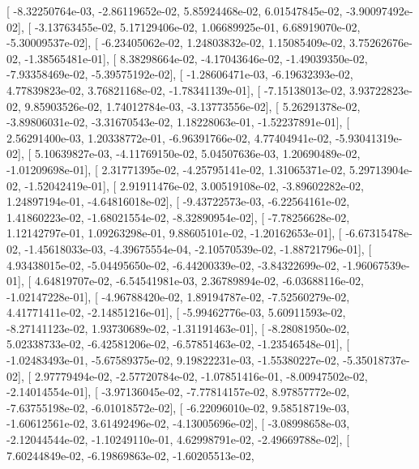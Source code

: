 \documentclass{article}
\begin{document}
       [ -8.32250764e-03,  -2.86119652e-02,   5.85924468e-02,
          6.01547845e-02,  -3.90097492e-02],
       [ -3.13763455e-02,   5.17129406e-02,   1.06689925e-01,
          6.68919070e-02,  -5.30009537e-02],
       [ -6.23405062e-02,   1.24803832e-02,   1.15085409e-02,
          3.75262676e-02,  -1.38565481e-01],
       [  8.38298664e-02,  -4.17043646e-02,  -1.49039350e-02,
         -7.93358469e-02,  -5.39575192e-02],
       [ -1.28606471e-03,  -6.19632393e-02,   4.77839823e-02,
          3.76821168e-02,  -1.78341139e-01],
       [ -7.15138013e-02,   3.93722823e-02,   9.85903526e-02,
          1.74012784e-03,  -3.13773556e-02],
       [  5.26291378e-02,  -3.89806031e-02,  -3.31670543e-02,
          1.18228063e-01,  -1.52237891e-01],
       [  2.56291400e-03,   1.20338772e-01,  -6.96391766e-02,
          4.77404941e-02,  -5.93041319e-02],
       [  5.10639827e-03,  -4.11769150e-02,   5.04507636e-03,
          1.20690489e-02,  -1.01209698e-01],
       [  2.31771395e-02,  -4.25795141e-02,   1.31065371e-02,
          5.29713904e-02,  -1.52042419e-01],
       [  2.91911476e-02,   3.00519108e-02,  -3.89602282e-02,
          1.24897194e-01,  -4.64816018e-02],
       [ -9.43722573e-03,  -6.22564161e-02,   1.41860223e-02,
         -1.68021554e-02,  -8.32890954e-02],
       [ -7.78256628e-02,   1.12142797e-01,   1.09263298e-01,
          9.88605101e-02,  -1.20162653e-01],
       [ -6.67315478e-02,  -1.45618033e-03,  -4.39675554e-04,
         -2.10570539e-02,  -1.88721796e-01],
       [  4.93438015e-02,  -5.04495650e-02,  -6.44200339e-02,
         -3.84322699e-02,  -1.96067539e-01],
       [  4.64819707e-02,  -6.54541981e-03,   2.36789894e-02,
         -6.03688116e-02,  -1.02147228e-01],
       [ -4.96788420e-02,   1.89194787e-02,  -7.52560279e-02,
          4.41771411e-02,  -2.14851216e-01],
       [ -5.99462776e-03,   5.60911593e-02,  -8.27141123e-02,
          1.93730689e-02,  -1.31191463e-01],
       [ -8.28081950e-02,   5.02338733e-02,  -6.42581206e-02,
         -6.57851463e-02,  -1.23546548e-01],
       [ -1.02483493e-01,  -5.67589375e-02,   9.19822231e-03,
         -1.55380227e-02,  -5.35018737e-02],
       [  2.97779494e-02,  -2.57720784e-02,  -1.07851416e-01,
         -8.00947502e-02,  -2.14014554e-01],
       [ -3.97136045e-02,  -7.77814157e-02,   8.97857772e-02,
         -7.63755198e-02,  -6.01018572e-02],
       [ -6.22096010e-02,   9.58518719e-03,  -1.60612561e-02,
          3.61492496e-02,  -4.13005696e-02],
       [ -3.08998658e-03,  -2.12044544e-02,  -1.10249110e-01,
          4.62998791e-02,  -2.49669788e-02],
       [  7.60244849e-02,  -6.19869863e-02,  -1.60205513e-02,
\end{document}
